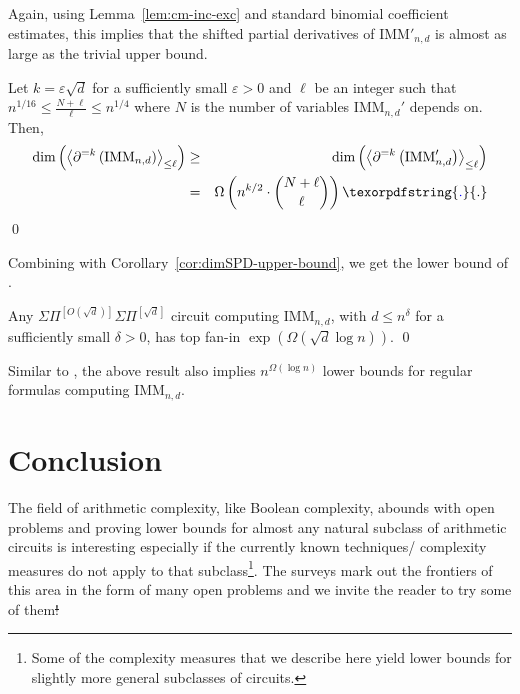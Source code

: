 \documentclass{birkjour}
\newcommand{\SPD}[3]{\inangle{\partial^{=#1}\inparen{#3}}_{\leq #2}}
\newcommand{\mySPSP}[2]{\Sigma\Pi^{[#1]}\Sigma\Pi^{[#2]}}
\renewcommand{\epsilon}{\varepsilon}
\providecommand{\DIFaddtex}[1]{{\protect\color{blue}\uwave{#1}}} %
\providecommand{\DIFdeltex}[1]{{\protect\color{red}\sout{#1}}}                      %
\providecommand{\DIFaddbegin}{} %
\providecommand{\DIFaddend}{} %
\providecommand{\DIFdelbegin}{} %
\providecommand{\DIFdelend}{} %
\providecommand{\DIFadd}[1]{\texorpdfstring{\DIFaddtex{#1}}{#1}} %
\providecommand{\DIFdel}[1]{\texorpdfstring{\DIFdeltex{#1}}{}} %
\begin{document}
Again, using Lemma~\ref{lem:cm-inc-exc} and standard binomial coefficient estimates, this implies that the shifted partial derivatives of $\mathrm{IMM}'_{n,d}$ is almost as large as the trivial upper bound. 

\begin{theorem}Let $k = \epsilon\sqrt{d}$ for a sufficiently small $\epsilon > 0$ and $\ell$ be an integer such that $n^{1/16} \leq \frac{N + \ell}{\ell} \leq n^{1/4}$ where $N$ is the number of variables $\mathrm{IMM}_{n,d}'$ depends on. Then, 
\begin{eqnarray*}
\dim\inparen{\SPD{k}{\ell}{\mathrm{IMM}_{n,d}}} &\geq& \dim\inparen{\SPD{k}{\ell}{\mathrm{IMM}'_{n,d}}} \\
& =& \Omega\inparen{n^{k/2} \cdot \binom{N + \ell}{\ell}}\DIFaddbegin \DIFadd{.
}\DIFaddend \end{eqnarray*}
\qed
\end{theorem}

Combining with Corollary~\ref{cor:dimSPD-upper-bound}, we get the lower bound of \cite{FLMS13}. 

\begin{theorem}
Any $\mySPSP{O(\sqrt{d})}{\sqrt{d}}$ circuit computing $\mathrm{IMM}_{n,d}$, with $d \leq n^{\delta}$ for a sufficiently small $\delta > 0$, has top fan-in $\exp(\Omega(\sqrt{d}\log n))$. \qed
\end{theorem}

Similar to \cite{KSS13}, the above result also implies $n^{\Omega(\log n)}$ lower bounds for regular formulas computing $\mathrm{IMM}_{n,d}$. 




\section{Conclusion}\label{sec:conclusion}
	The field of arithmetic complexity, like Boolean complexity, 
	abounds with open problems and proving lower bounds for 
	almost any natural subclass of arithmetic circuits is 
	interesting especially if the currently known techniques/
	complexity measures do not apply to that subclass\footnote{
		Some of the complexity measures that we describe here 
		yield lower bounds for slightly more general subclasses 
		of circuits.
	}. 
	The surveys \cite{aviSurvey, sy, ckw11} mark out the 
	frontiers of this area in the form of many open problems 
	and we invite the reader to try some of them\DIFdelbegin \DIFdel{! 
	}\DIFdelend \DIFaddbegin \DIFadd{.
	}\DIFaddend 

	





\end{document}
